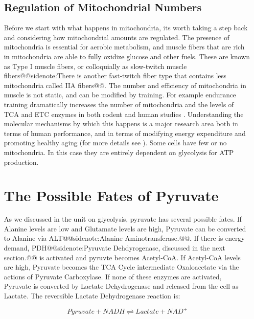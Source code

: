 \documentclass{tufte-handout}
\makeatletter
\def\sidenote#1{@@sidenote:#1@@}
\makeatother
\begin{document}
\subsection{Regulation of Mitochondrial Numbers}
Before we start with what happens in mitochondria, its worth taking a step back and considering how mitochondrial amounts are regulated.  The presence of mitochondria is essential for aerobic metabolism, and muscle fibers that are rich in mitochondria are able to fully oxidize glucose and other fuels.  These are known as Type I muscle fibers, or colloquially as slow-twitch muscle fibers\sidenote{There is another fast-twitch fiber type that contains less mitochondria called IIA fibers}.  The number and efficiency of mitochondria in muscle is not static, and can be modified by training.  For example endurance training dramatically increases the number of mitochondria and the levels of TCA and ETC enzymes in both rodent and human studies \citep{Exercise1967,Gollnick1972,Gollnick1973,holloszyRegulationMitochondrialBiogenesis2011}.  Understanding the molecular mechanisms by which this happens is a major research area both in terms of human performance, and in terms of modifying energy expenditure and promoting healthy aging (for more details see \citet{Cartee2016}).  Some cells have few or no mitochondria.  In this case they are entirely dependent on glycolysis for ATP production.

\section{The Possible Fates of Pyruvate}

As we discussed in the unit on glycolysis, pyruvate has several possible fates.  If Alanine levels are low and Glutamate levels are high, Pyruvate can be converted to Alanine via ALT\sidenote{Alanine Aminotransferase.}.  If there is energy demand, PDH\sidenote{Pyruvate Dehdyrogenase, discussed in the next section.} is activated and pyruvte becomes Acetyl-CoA.  If Acetyl-CoA levels are high, Pyruvate becomes the TCA Cycle intermediate Oxaloacetate via the actions of Pyruvate Carboxylase.  If none of these enzymes are activated, Pyruvate is converted by Lactate Dehydrogenase and released from the cell as Lactate.  The reversible Lactate Dehydrogenase reaction is:

\begin{equation}\label{eq:ldh}
Pyruvate + NADH \rightleftharpoons Lactate + NAD^+
\end{equation}
\end{document}
